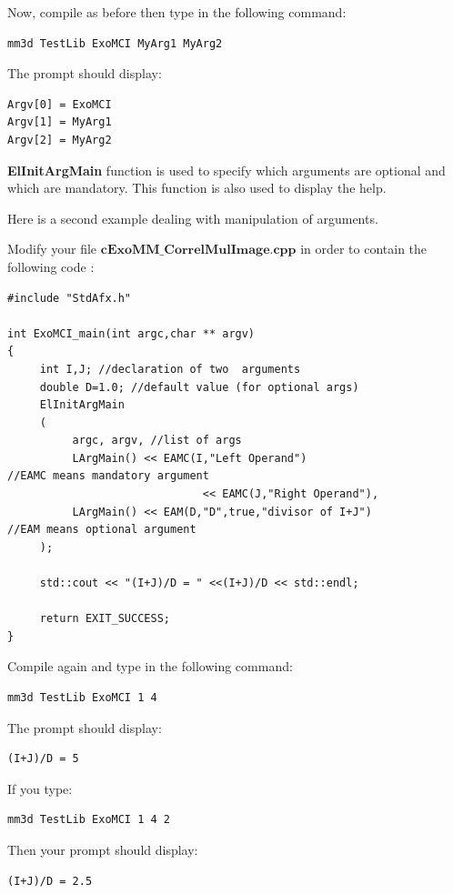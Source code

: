 Now, compile as before then type in the following command:
\begin{verbatim}
mm3d TestLib ExoMCI MyArg1 MyArg2
\end{verbatim}

The prompt should display:\newline

\begin{verbatim}
Argv[0] = ExoMCI
Argv[1] = MyArg1
Argv[2] = MyArg2
\end{verbatim}

\textbf{ElInitArgMain} function is used to specify which arguments are optional and which are mandatory. This function is also used to display the help. \newline

Here is a second example dealing with manipulation of arguments.\newline

Modify your file $\textbf{cExoMM\_CorrelMulImage.cpp}$ in order to contain the following code :

\begin{verbatim}
#include "StdAfx.h"

int ExoMCI_main(int argc,char ** argv)
{
     int I,J; //declaration of two  arguments
     double D=1.0; //default value (for optional args)
     ElInitArgMain
     (
          argc, argv, //list of args
          LArgMain() << EAMC(I,"Left Operand")
//EAMC means mandatory argument
                              << EAMC(J,"Right Operand"),
          LArgMain() << EAM(D,"D",true,"divisor of I+J")
//EAM means optional argument
     );

     std::cout << "(I+J)/D = " <<(I+J)/D << std::endl;

     return EXIT_SUCCESS;
}
\end{verbatim}

Compile again and type in the following command:
\begin{verbatim}
mm3d TestLib ExoMCI 1 4
\end{verbatim}

The prompt should display:
\begin{verbatim}
(I+J)/D = 5
\end{verbatim}

If you type:
\begin{verbatim}
mm3d TestLib ExoMCI 1 4 2
\end{verbatim}

Then your prompt should display:
\begin{verbatim}
(I+J)/D = 2.5
\end{verbatim}
